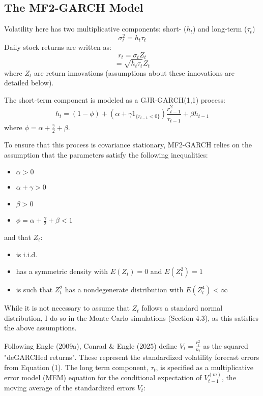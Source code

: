 \documentclass[12pt]{article}
\begin{document}
\subsection{The MF2-GARCH Model}
Volatility here has two multiplicative components: short- ($h_t$) and long-term ($\tau_t$)
\begin{equation}
\nonumber
\sigma_t^2=h_t\tau_t
\end{equation}
Daily stock returns are written as:
\begin{equation}
\nonumber
r_t=\sigma_tZ_t
\end{equation}
\begin{equation}
\nonumber
=\sqrt{h_t\tau_t}Z_t
\end{equation}
where $Z_t$ are return innovations (assumptions about these innovations are detailed below).\par
\vspace{5mm}
\noindent The short-term component is modeled as a GJR-GARCH(1,1) process:
\begin{equation}
h_t=(1-\phi)+(\alpha+\gamma1_{\{r_{t-1}<0\}})\frac{r_{t-1}^2}{\tau_{t-1}}+\beta h_{t-1}
\end{equation}
where $\phi=\alpha+\frac{\gamma}{2}+\beta$.\par
To ensure that this process is covariance stationary, MF2-GARCH relies on the assumption that the parameters satisfy the following inequalities:
\begin{itemize}
\item$\alpha>0$
\item$\alpha+\gamma>0$
\item$\beta>0$
\item$\phi=\alpha+\frac{\gamma}{2}+\beta<1$
\end{itemize}
and that $Z_t$:
\begin{itemize}
\item is i.i.d.
\item has a symmetric density with $E(Z_t)=0$ and $E(Z_t^2)=1$
\item is such that $Z_t^2$ has a nondegenerate distribution with $E(Z_t^4)<\infty$
\end{itemize}
While it is not necessary to assume that $Z_t$ follows a standard normal distribution, I do so in the Monte Carlo simulations (Section 4.3), as this satisfies the above assumptions.\par
Following Engle (2009a), Conrad \& Engle (2025) define $V_t=\frac{r_t^2}{h_t}$ as the squared "deGARCHed returns". These represent the standardized volatility forecast errors from Equation (1). The long term component, $\tau_t$, is specified as a multiplicative error model (MEM) equation for the conditional expectation of $V_{t-1}^{(m)}$, the moving average of the standardized errors $V_t$:
\end{document}
